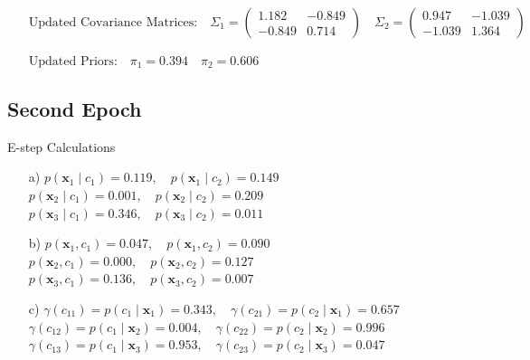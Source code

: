 \documentclass[12pt]{article}
\begin{document}
\begin{enumerate}[leftmargin=0pt, label=\textbf{\arabic*.)}]
\begin{enumerate}
              \item[]
                    $\text{Updated Covariance Matrices:} \quad \Sigma_1 = \begin{pmatrix} 1.182 & -0.849 \\ -0.849 & 0.714 \end{pmatrix} \quad \Sigma_2 = \begin{pmatrix} 0.947 & -1.039 \\ -1.039 & 1.364 \end{pmatrix}$ \\

              \item[]
                    $\text{Updated Priors:} \quad \pi_1 = 0.394 \quad \pi_2 = 0.606$ \\
          \end{enumerate}

          \subsection*{Second Epoch}
          E-step Calculations \\
          \begin{enumerate}
              \item[a)]
                    $p(\mathbf{x}_1 \mid c_1) = 0.119, \quad p(\mathbf{x}_1 \mid c_2) = 0.149$ \\
                    $p(\mathbf{x}_2 \mid c_1) = 0.001, \quad p(\mathbf{x}_2 \mid c_2) = 0.209$ \\
                    $p(\mathbf{x}_3 \mid c_1) = 0.346, \quad p(\mathbf{x}_3 \mid c_2) = 0.011$

              \item[b)]
                    $p(\mathbf{x}_1, c_1) = 0.047, \quad p(\mathbf{x}_1, c_2) = 0.090$ \\
                    $p(\mathbf{x}_2, c_1) = 0.000, \quad p(\mathbf{x}_2, c_2) = 0.127$ \\
                    $p(\mathbf{x}_3, c_1) = 0.136, \quad p(\mathbf{x}_3, c_2) = 0.007$

              \item[c)]
                    $\gamma(c_{11}) = p(c_1 \mid \mathbf{x}_1) = 0.343, \quad \gamma(c_{21}) = p(c_2 \mid \mathbf{x}_1) = 0.657$ \\
                    $\gamma(c_{12}) = p(c_1 \mid \mathbf{x}_2) = 0.004, \quad \gamma(c_{22}) = p(c_2 \mid \mathbf{x}_2) = 0.996$ \\
                    $\gamma(c_{13}) = p(c_1 \mid \mathbf{x}_3) = 0.953, \quad \gamma(c_{23}) = p(c_2 \mid \mathbf{x}_3) = 0.047$
          \end{enumerate}


\end{enumerate}
\end{document}
